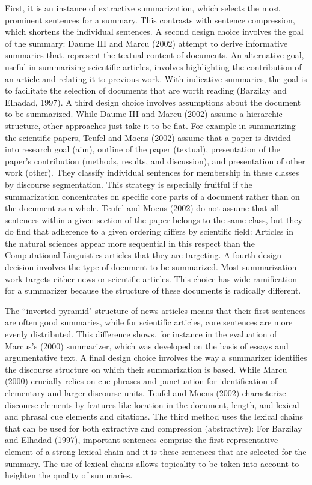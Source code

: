 First, it is an instance of extractive summarization, which selects the most prominent sentences for a summary.
This contrasts with sentence compression, which shortens the individual sentences. 
A second design choice involves the goal of the summary: Daume III and Marcu (2002) attempt to derive informative summaries that. represent the textual content of documents. 
An alternative goal, useful in summarizing scientific articles, involves highlighting the contribution of an article and relating it to previous work. 
With indicative summaries, the goal is to facilitate the selection of documents that are worth reading (Barzilay and Elhadad, 1997). 
A third design choice involves assumptions about the document to be summarized.
While  Daume III and Marcu (2002) assume a hierarchic structure, other approaches just take it to be flat. 
For example in summarizing the scientific papers, Teufel and Moens (2002) assume that a paper is divided into research goal (aim), outline of the paper (textual), presentation of the paper's contribution (methods, results, and discussion), and presentation of other work (other). 
They classify individual sentences for membership in these classes by discourse segmentation. 
This strategy is especially fruitful if the summarization concentrates on specific core parts of a document rather than on the document as a whole. 
Teufel and Moens (2002) do not assume that all sentences within a given section of the paper belongs to the same class, but they do find that adherence to a given ordering differs by scientific field: Articles in the natural sciences appear more sequential in this respect than the Computational Linguistics articles that they are targeting. 
A fourth design decision involves the type of document to be summarized.
Most summarization work targets either news or scientific articles. 
This choice has wide ramification for a summarizer because the structure of these documents is radically different. 
 
The ``inverted pyramid" structure of news articles means that their first sentences are often good summaries, while for scientific articles, core sentences are more evenly distributed. 
This difference shows, for instance in the evaluation of Marcus's (2000) summarizer, which was developed on the basis of essays and argumentative text.
A final design choice involves the way a summarizer identifies the discourse structure on which their summarization is based. 
While Marcu (2000) crucially relies on cue phrases and punctuation for identification of elementary and larger discourse units. 
Teufel and Moens (2002) characterize discourse elements by features like location in the document, length, and lexical and phrasal cue elements and citations. 
The third method uses the lexical chains that can be used for both extractive and compression (abstractive): For Barzilay and Elhadad (1997), important sentences comprise the first representative element of a strong lexical chain and it is these sentences that are selected for the summary. 
The use of lexical chains allows topicality to be taken into account to heighten the quality of summaries. 

